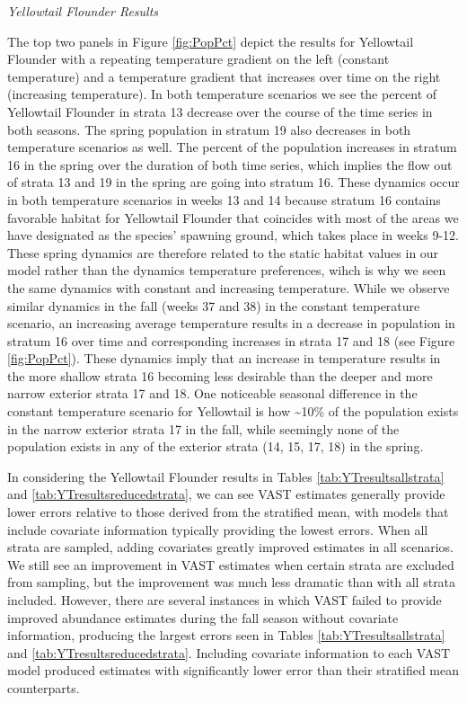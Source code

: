 \documentclass[
  12pt,
]{article}
\begin{document}
\emph{Yellowtail Flounder Results}

The top two panels in Figure \ref{fig:PopPct} depict the results for Yellowtail Flounder with a repeating temperature gradient on the left (constant temperature) and a temperature gradient that increases over time on the right (increasing temperature). In both temperature scenarios we see the percent of Yellowtail Flounder in strata 13 decrease over the course of the time series in both seasons. The spring population in stratum 19 also decreases in both temperature scenarios as well. The percent of the population increases in stratum 16 in the spring over the duration of both time series, which implies the flow out of strata 13 and 19 in the spring are going into stratum 16. These dynamics occur in both temperature scenarios in weeks 13 and 14 because stratum 16 contains favorable habitat for Yellowtail Flounder that coincides with most of the areas we have designated as the species' spawning ground, which takes place in weeks 9-12. These spring dynamics are therefore related to the static habitat values in our model rather than the dynamics temperature preferences, wihch is why we seen the same dynamics with constant and increasing temperature. While we observe similar dynamics in the fall (weeks 37 and 38) in the constant temperature scenario, an increasing average temperature results in a decrease in population in stratum 16 over time and corresponding increases in strata 17 and 18 (see Figure \ref{fig:PopPct}). These dynamics imply that an increase in temperature results in the more shallow strata 16 becoming less desirable than the deeper and more narrow exterior strata 17 and 18. One noticeable seasonal difference in the constant temperature scenario for Yellowtail is how \textasciitilde10\% of the population exists in the narrow exterior strata 17 in the fall, while seemingly none of the population exists in any of the exterior strata (14, 15, 17, 18) in the spring.

In considering the Yellowtail Flounder results in Tables \ref{tab:YTresultsallstrata} and \ref{tab:YTresultsreducedstrata}, we can see VAST estimates generally provide lower errors relative to those derived from the stratified mean, with models that include covariate information typically providing the lowest errors. When all strata are sampled, adding covariates greatly improved estimates in all scenarios. We still see an improvement in VAST estimates when certain strata are excluded from sampling, but the improvement was much less dramatic than with all strata included. However, there are several instances in which VAST failed to provide improved abundance estimates during the fall season without covariate information, producing the largest errors seen in Tables \ref{tab:YTresultsallstrata} and \ref{tab:YTresultsreducedstrata}. Including covariate information to each VAST model produced estimates with significantly lower error than their stratified mean counterparts.
\end{document}
